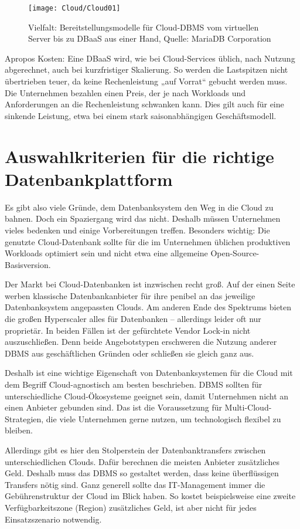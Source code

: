 \begin{figure}
	\texttt{[image: Cloud/Cloud01]}
	\caption[Bereitstellungsmodelle für Cloud-DBMS]{Vielfalt: Bereitstellungsmodelle für Cloud-DBMS vom virtuellen Server bis zu DBaaS aus einer Hand, Quelle: MariaDB Corporation}
\end{figure}


Apropos Kosten: Eine DBaaS wird, wie bei Cloud-Services üblich, nach Nutzung abgerechnet, auch bei kurzfristiger Skalierung. So werden die Lastspitzen nicht übertrieben teuer, da keine Rechenleistung „auf Vorrat“ gebucht werden muss. Die Unternehmen bezahlen einen Preis, der je nach Workloads und Anforderungen an die Rechenleistung schwanken kann. Dies gilt auch für eine sinkende Leistung, etwa bei einem stark saisonabhängigen Geschäftsmodell.

\section{Auswahlkriterien für die richtige Datenbankplattform}

Es gibt also viele Gründe, dem Datenbanksystem den Weg in die Cloud zu bahnen. Doch ein Spaziergang wird das nicht. Deshalb müssen Unternehmen vieles bedenken und einige Vorbereitungen treffen. Besonders wichtig: Die genutzte Cloud-Datenbank sollte für die im Unternehmen üblichen produktiven Workloads optimiert sein und nicht etwa eine allgemeine Open-Source-Basisversion.

Der Markt bei Cloud-Datenbanken ist inzwischen recht groß. Auf der einen Seite werben klassische Datenbankanbieter für ihre penibel an das jeweilige Datenbanksystem angepassten Clouds. Am anderen Ende des Spektrums bieten die großen Hyperscaler alles für Datenbanken – allerdings leider oft nur proprietär. In beiden Fällen ist der gefürchtete Vendor Lock-in nicht auszuschließen. Denn beide Angebotstypen erschweren die Nutzung anderer DBMS aus geschäftlichen Gründen oder schließen sie gleich ganz aus.

Deshalb ist eine wichtige Eigenschaft von Datenbanksystemen für die Cloud mit dem Begriff Cloud-agnostisch am besten beschrieben. DBMS sollten für unterschiedliche Cloud-Ökosysteme geeignet sein, damit Unternehmen nicht an einen Anbieter gebunden sind. Das ist die Voraussetzung für Multi-Cloud-Strategien, die viele Unternehmen gerne nutzen, um technologisch flexibel zu bleiben.

Allerdings gibt es hier den Stolperstein der Datenbanktransfers zwischen unterschiedlichen Clouds. Dafür berechnen die meisten Anbieter zusätzliches Geld. Deshalb muss das DBMS so gestaltet werden, dass keine überflüssigen Transfers nötig sind. Ganz generell sollte das IT-Management immer die Gebührenstruktur der Cloud im Blick haben. So kostet beispielsweise eine zweite Verfügbarkeitszone (Region) zusätzliches Geld, ist aber nicht für jedes Einsatzszenario notwendig.

